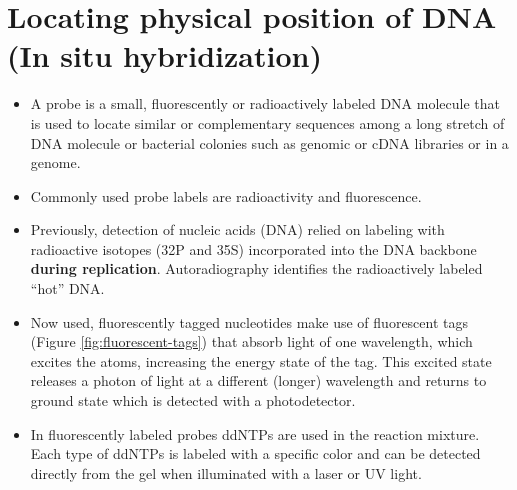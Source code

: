 \documentclass[11pt,dvipsnames,ignorenonframetext,aspectratio=169]{beamer}
\providecommand{\tightlist}{%
  \setlength{\itemsep}{0pt}\setlength{\parskip}{0pt}}
\begin{document}
\hypertarget{locating-physical-position-of-dna-in-situ-hybridization}{%
\section{Locating physical position of DNA (In situ
hybridization)}\label{locating-physical-position-of-dna-in-situ-hybridization}}

\begin{frame}{}
\protect\hypertarget{section-2}{}
\begin{itemize}
\tightlist
\item
  A probe is a small, fluorescently or radioactively labeled DNA
  molecule that is used to locate similar or complementary sequences
  among a long stretch of DNA molecule or bacterial colonies such as
  genomic or cDNA libraries or in a genome.
\item
  Commonly used probe labels are radioactivity and fluorescence.
\item
  Previously, detection of nucleic acids (DNA) relied on labeling with
  radioactive isotopes (32P and 35S) incorporated into the DNA backbone
  \textbf{during replication}. Autoradiography identifies the
  radioactively labeled ``hot'' DNA.
\item
  Now used, fluorescently tagged nucleotides make use of fluorescent
  tags (Figure \ref{fig:fluorescent-tags}) that absorb light of one
  wavelength, which excites the atoms, increasing the energy state of
  the tag. This excited state releases a photon of light at a different
  (longer) wavelength and returns to ground state which is detected with
  a photodetector.
\item
  In fluorescently labeled probes ddNTPs are used in the reaction
  mixture. Each type of ddNTPs is labeled with a specific color and can
  be detected directly from the gel when illuminated with a laser or UV
  light.
\end{itemize}
\end{frame}
\end{document}
